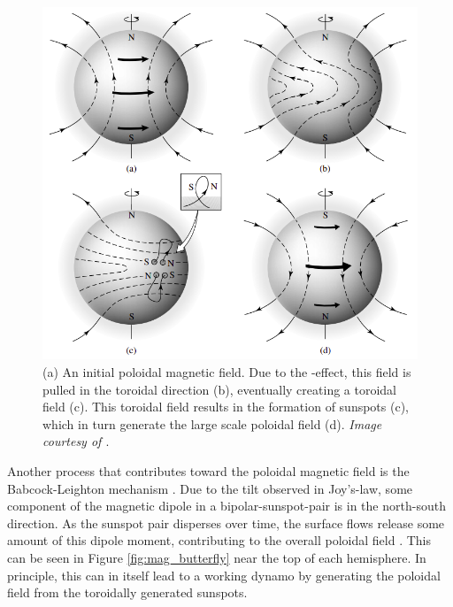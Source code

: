 \documentclass[11pt,a4paper,onecolumn]{report}
\begin{document}
\begin{figure}[t]
  \centering
  \includegraphics[width=0.6\linewidth]{dynamo.png}
  \caption{(a) An initial poloidal magnetic field. Due to the
  \textomega-effect, this field is pulled in the toroidal direction (b),
  eventually creating a toroidal field (c). This toroidal field results in the
  formation of sunspots (c), which in turn generate the large scale poloidal field
  (d). \textit{Image courtesy of \citet{carroll2006}}.}
  \label{fig:dynamo}
\end{figure}


Another process that contributes toward the poloidal magnetic field is the
Babcock-Leighton mechanism
\citep{babcock_topology_1961,leighton_transport_1964}. Due to the tilt observed
in Joy's-law, some component of the magnetic dipole in a bipolar-sunspot-pair is
in the north-south direction. As the sunspot pair disperses over time, the
surface flows release some amount of this dipole moment, contributing to the
overall poloidal field . This can be seen in Figure \ref{fig:mag_butterfly}
near the top of each hemisphere. In principle, this can in itself lead to a
working dynamo by generating the poloidal field from the toroidally generated
sunspots. \\
\end{document}
